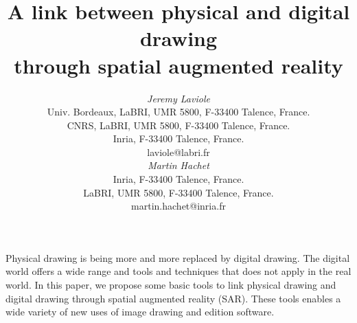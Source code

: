 \documentclass{article}
\begin{document}




\title{A link between physical and digital drawing \\
       through spatial augmented reality}


\author{
\parbox[t]{9cm}{\centering
	     {\em Jeremy Laviole}\\
	     Univ. Bordeaux, LaBRI, UMR 5800, F-33400 Talence, France.\\
         CNRS, LaBRI, UMR 5800, F-33400 Talence, France.\\
	     Inria, F-33400 Talence, France.\\
	     laviole@labri.fr}
\parbox[t]{9cm}{\centering
	     {\em Martin Hachet}\\
	     Inria, F-33400 Talence, France.\\
	     LaBRI, UMR 5800, F-33400 Talence, France.\\
	     martin.hachet@inria.fr}
}

\maketitle

\abstract

Physical drawing is being more and more replaced by digital drawing. The digital world offers a wide range and tools and techniques that does not apply in the real world. In this paper, we propose some basic tools to link physical drawing and digital drawing through spatial augmented reality (SAR). These tools enables a wide variety of new uses of image drawing and edition software.
\end{document}
